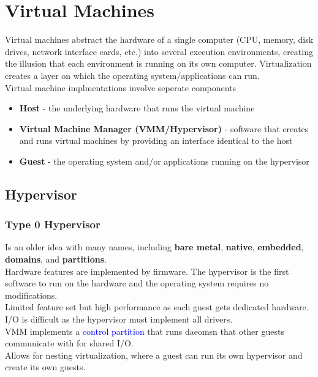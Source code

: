 \documentclass[oneside]{book}
\begin{document}
    \chapter{Virtual Machines}
        Virtual machines abstract the hardware of a single computer (CPU, memory, disk drives, network interface cards, etc.)
        into several execution environments, creating the illusion that each environment is running on its own computer.
        Virtualization creates a layer on which the operating system/applications can run.\\
        Virtual machine implmentations involve seperate components
        \begin{itemize}
            \item \textbf{Host} - the underlying hardware that runs the virtual machine
            \item \textbf{Virtual Machine Manager (VMM/Hypervisor)} - software that creates and runs 
            virtual machines by providing an interface identical to the host
            \item \textbf{Guest} - the operating system and/or applications running on the hypervisor
        \end{itemize}
        \section{Hypervisor}
            \subsection{Type 0 Hypervisor}
                Is an older idea with many names, including \textbf{bare metal}, \textbf{native}, \textbf{embedded}, \textbf{domains},
                and \textbf{partitions}.\\
                Hardware features are implemented by firmware. The hypervisor is the first software to run on the hardware and the operating
                system requires no modifications.\\
                Limited feature set but high performance as each guest gets dedicated hardware.\\
                I/O is difficult as the hypervisor must implement all drivers.\\
                VMM implements a \textcolor{blue}{control partition} that runs daeomsn that other guests communicate
                with for shared I/O.\\
                Allows for nesting virtualization, where a guest can run its own hypervisor and create its own guests.
\end{document}
